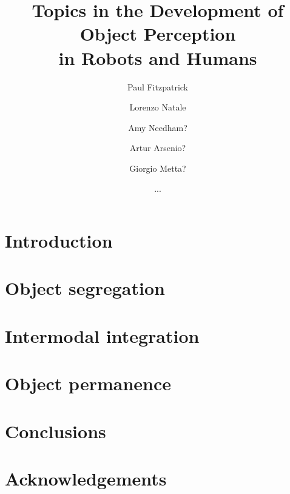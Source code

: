 \documentclass[a4]{epirob}
\title{
Topics in the Development of Object Perception \\ in Robots and Humans
}
\author{Paul Fitzpatrick  \and Lorenzo Natale \and Amy Needham? \and
Artur Arsenio?  \and Giorgio Metta? \and ...}
\begin{document}
\maketitle


\begin{abstract}

\end{abstract}


\section{Introduction}




\section{Object segregation}




\section{Intermodal integration}




\section{Object permanence}






%



\section{Conclusions}




\section*{Acknowledgements}






\nocite{natale05developmental}
\nocite{arsenio05exploiting}


\end{document}
